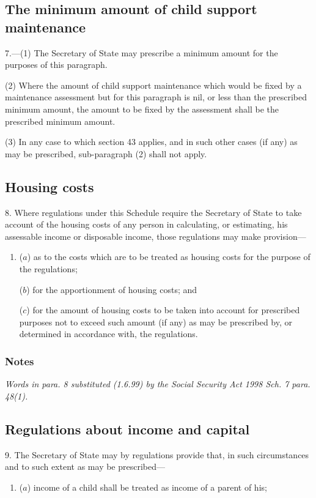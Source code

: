 \documentclass[a4paper]{article}
\newcommand\amendment[1]{\subsubsection*{Notes}{\itshape\frenchspacing\footnotesize #1 \par}}
\begin{document}
{\subsection*{The minimum amount of child support maintenance}

7.---(1) The Secretary of State may prescribe a minimum amount for the purposes of this paragraph.

(2) Where the amount of child support maintenance which would be fixed by a maintenance assessment but for this paragraph is nil, or less than the prescribed minimum amount, the amount to be fixed by the assessment shall be the prescribed minimum amount.

(3) In any case to which section 43 applies, and in such other cases (if any) as may be prescribed, sub-paragraph (2) shall not apply.

\subsection*{Housing costs}

8. Where regulations under this Schedule require the Secretary of State to take account of the housing costs of any person in calculating, or estimating, his assessable income or disposable income, those regulations may make provision---
\begin{enumerate}\item[]
($a$) as to the costs which are to be treated as housing costs for the purpose of the regulations;

($b$) for the apportionment of housing costs; and

($c$) for the amount of housing costs to be taken into account for prescribed purposes not to exceed such amount (if any) as may be prescribed by, or determined in accordance with, the regulations.
\end{enumerate}

\amendment{
Words in para. 8 substituted (1.6.99) by the Social Security Act 1998 Sch. 7 para. 48(1).
}

\subsection*{Regulations about income and capital}

9. The Secretary of State may by regulations provide that, in such circumstances and to such extent as may be prescribed---
\begin{enumerate}\item[]
($a$) income of a child shall be treated as income of a parent of his;


\end{enumerate}}
\end{document}
